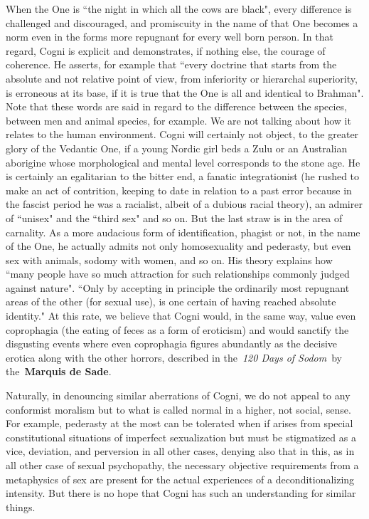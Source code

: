 When the One is ``the night in which all the cows are black", every difference is challenged and discouraged, and
promiscuity in the name of that One becomes a norm even in the forms more repugnant for every well born person. In that
regard, Cogni is explicit and demonstrates, if nothing else, the courage of coherence. He asserts, for example that
``every doctrine that starts from the absolute and not relative point of view, from inferiority or hierarchal
superiority, is erroneous at its base, if it is true that the One is all and identical to Brahman". Note that these
words are said in regard to the difference between the species, between men and animal species, for example. We are not
talking about how it relates to the human environment. Cogni will certainly not object, to the greater glory of the
Vedantic One, if a young Nordic girl beds a Zulu or an Australian aborigine whose morphological and mental level
corresponds to the stone age. He is certainly an egalitarian to the bitter end, a fanatic integrationist (he rushed to
make an act of contrition, keeping to date in relation to a past error because in the fascist period he was a
racialist, albeit of a dubious racial theory), an admirer of ``unisex" and the ``third sex" and so on. But the last straw
is in the area of carnality. As a more audacious form of identification, phagist or not, in the name of the One, he
actually admits not only homosexuality and pederasty, but even sex with animals, sodomy with women, and so on. His
theory explains how ``many people have so much attraction for such relationships commonly judged against nature". ``Only
by accepting in principle the ordinarily most repugnant areas of the other (for sexual use), is one certain of having
reached absolute identity." At this rate, we believe that Cogni would, in the same way, value even coprophagia (the
eating of feces as a form of eroticism) and would sanctify the disgusting events where even coprophagia figures
abundantly as the decisive erotica along with the other horrors, described in the \emph{120 Days of Sodom} by
the \textbf{Marquis de Sade}.

Naturally, in denouncing similar aberrations of Cogni, we do not appeal to any conformist moralism but to what is called
normal in a higher, not social, sense. For example, pederasty at the most can be tolerated when if arises from special
constitutional situations of imperfect sexualization but must be stigmatized as a vice, deviation, and perversion in
all other cases, denying also that in this, as in all other case of sexual psychopathy, the necessary objective
requirements from a metaphysics of sex are present for the actual experiences of a deconditionalizing intensity. But
there is no hope that Cogni has such an understanding for similar things.

